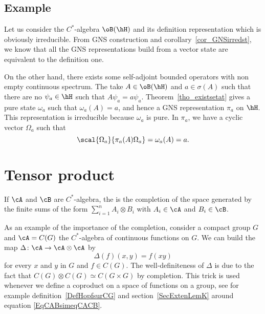 \subsection{Example}

Let us consider the $C^*$-algebra $\oB(\hH)$ and its definition representation which is obviously irreducible. From GNS construction and corollary~\ref{cor_GNSirredst}, we know that all the GNS representations build from a vector state are equivalent to the definition one.

On the other hand, there exists some self-adjoint bounded operators with non empty continuous spectrum. The take $A\in\oB(\hH)$ and $a\in\sigma(A)$ such that there are no $\psi_a\in\hH$ such that $A\psi_a=a\psi_a$. Theorem~\ref{tho_existsetat} gives a pure state $\omega_a$ such that $\omega_a(A)=a$, and hence a GNS representation $\pi_a$ on $\hH$. This representation is irreducible because $\omega_a$ is pure. In $\pi_a$, we have  a cyclic vector $\Omega_a$ such that
\[
	\scal{\Omega_a}{\pi_a(A)\Omega_a}=\omega_a(A)=a.
\]

\section{Tensor product}            \label{SecTensProdCSA}

If $\cA$ and $\cB$ are $C^*$-algebra, the  is the completion of the space generated by the finite sums of the form $\sum_{i=1}^n A_i\otimes B_i$ with $A_i\in\cA$ and $B_i\in\cB$.

As an example of the importance of the completion, consider a compact group $G$ and $\cA=C(G)$ the $C^*$-algebra of continuous functions on $G$. We can build the map $\Delta\colon \cA\to \cA\otimes \cA$ by
\begin{equation}
	\Delta(f)(x,y)=f(xy)
\end{equation}
for every $x$ and $y$ in $G$ and $f\in C(G)$. The well-definiteness of $\Delta$ is due to the fact that $C(G)\otimes C(G)\simeq C(G\times G)$ by completion. This trick is used whenever we define a coproduct on a space of functions on a group, see for example definition~\ref{DefHopfsurCG} and section~\ref{SecExtenLemK} around equation \eqref{EqCABsimeqCACB}.

